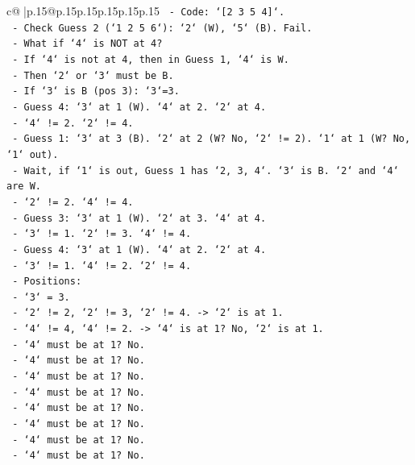 \documentclass{article}
\begin{document}
{\begin{supertabular}{c@{$\;$}|p{.15\linewidth}@{}p{.15\linewidth}p{.15\linewidth}p{.15\linewidth}p{.15\linewidth}p{.15\linewidth}}
{{{\texttt{        {-} Code: `{[}2 3 5 4{]}`.} \\
\texttt{        {-} Check Guess 2 (`1 2 5 6`): `2` (W), `5` (B). Fail.} \\
\texttt{    {-} What if `4` is NOT at 4?} \\
\texttt{        {-} If `4` is not at 4, then in Guess 1, `4` is W.} \\
\texttt{        {-} Then `2` or `3` must be B.} \\
\texttt{        {-} If `3` is B (pos 3): `3`=3.} \\
\texttt{        {-} Guess 4: `3` at 1 (W). `4` at 2. `2` at 4.} \\
\texttt{        {-} `4` != 2. `2` != 4.} \\
\texttt{        {-} Guess 1: `3` at 3 (B). `2` at 2 (W? No, `2` != 2). `1` at 1 (W? No, `1` out).} \\
\texttt{        {-} Wait, if `1` is out, Guess 1 has `2, 3, 4`. `3` is B. `2` and `4` are W.} \\
\texttt{        {-} `2` != 2. `4` != 4.} \\
\texttt{        {-} Guess 3: `3` at 1 (W). `2` at 3. `4` at 4.} \\
\texttt{        {-} `3` != 1. `2` != 3. `4` != 4.} \\
\texttt{        {-} Guess 4: `3` at 1 (W). `4` at 2. `2` at 4.} \\
\texttt{        {-} `3` != 1. `4` != 2. `2` != 4.} \\
\texttt{        {-} Positions:} \\
\texttt{            {-} `3` = 3.} \\
\texttt{            {-} `2` != 2, `2` != 3, `2` != 4. {-}> `2` is at 1.} \\
\texttt{            {-} `4` != 4, `4` != 2. {-}> `4` is at 1? No, `2` is at 1.} \\
\texttt{            {-} `4` must be at 1? No.} \\
\texttt{            {-} `4` must be at 1? No.} \\
\texttt{            {-} `4` must be at 1? No.} \\
\texttt{            {-} `4` must be at 1? No.} \\
\texttt{            {-} `4` must be at 1? No.} \\
\texttt{            {-} `4` must be at 1? No.} \\
\texttt{            {-} `4` must be at 1? No.} \\
\texttt{            {-} `4` must be at 1? No.} \\
}}}
\end{supertabular}}
\end{document}
